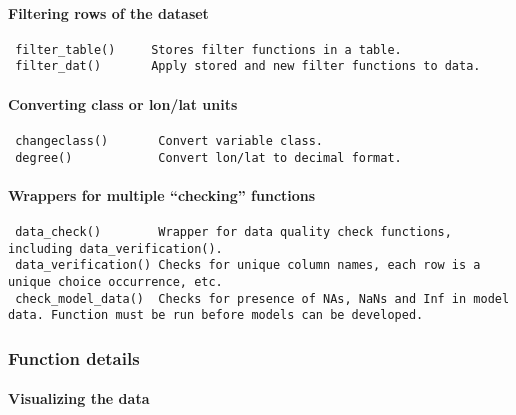 \documentclass[
]{article}
\begin{document}
\hypertarget{filtering-rows-of-the-dataset}{%
\paragraph{Filtering rows of the dataset}\label{filtering-rows-of-the-dataset}}

\begin{verbatim}
 filter_table()     Stores filter functions in a table.     
 filter_dat()       Apply stored and new filter functions to data.
\end{verbatim}

\hypertarget{converting-class-or-lonlat-units}{%
\paragraph{Converting class or lon/lat units}\label{converting-class-or-lonlat-units}}

\begin{verbatim}
 changeclass()       Convert variable class.
 degree()            Convert lon/lat to decimal format.
\end{verbatim}

\hypertarget{wrappers-for-multiple-checking-functions}{%
\paragraph{Wrappers for multiple ``checking'' functions}\label{wrappers-for-multiple-checking-functions}}

\begin{verbatim}
 data_check()        Wrapper for data quality check functions, including data_verification().
 data_verification() Checks for unique column names, each row is a unique choice occurrence, etc.
 check_model_data()  Checks for presence of NAs, NaNs and Inf in model data. Function must be run before models can be developed.
\end{verbatim}

\hypertarget{function-details-3}{%
\subsubsection{Function details}\label{function-details-3}}

\hypertarget{visualizing-the-data-1}{%
\paragraph{Visualizing the data}\label{visualizing-the-data-1}}
\end{document}

